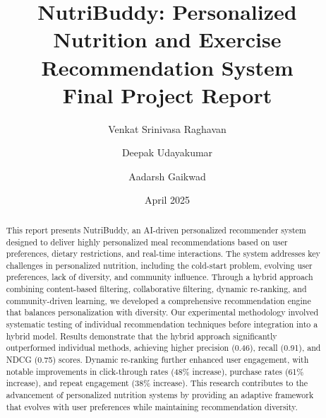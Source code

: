 \documentclass[12pt,a4paper]{article}
\title{NutriBuddy: Personalized Nutrition and Exercise Recommendation System\\
\large Final Project Report}
\author{Venkat Srinivasa Raghavan \and Deepak Udayakumar \and Aadarsh Gaikwad}
\date{April 2025}
\begin{document}
\maketitle

\begin{abstract}
This report presents NutriBuddy, an AI-driven personalized recommender system designed to deliver highly personalized meal recommendations based on user preferences, dietary restrictions, and real-time interactions. The system addresses key challenges in personalized nutrition, including the cold-start problem, evolving user preferences, lack of diversity, and community influence. Through a hybrid approach combining content-based filtering, collaborative filtering, dynamic re-ranking, and community-driven learning, we developed a comprehensive recommendation engine that balances personalization with diversity. Our experimental methodology involved systematic testing of individual recommendation techniques before integration into a hybrid model. Results demonstrate that the hybrid approach significantly outperformed individual methods, achieving higher precision (0.46), recall (0.91), and NDCG (0.75) scores. Dynamic re-ranking further enhanced user engagement, with notable improvements in click-through rates (48\% increase), purchase rates (61\% increase), and repeat engagement (38\% increase). This research contributes to the advancement of personalized nutrition systems by providing an adaptive framework that evolves with user preferences while maintaining recommendation diversity.
\end{abstract}

\tableofcontents
\newpage
\end{document}
